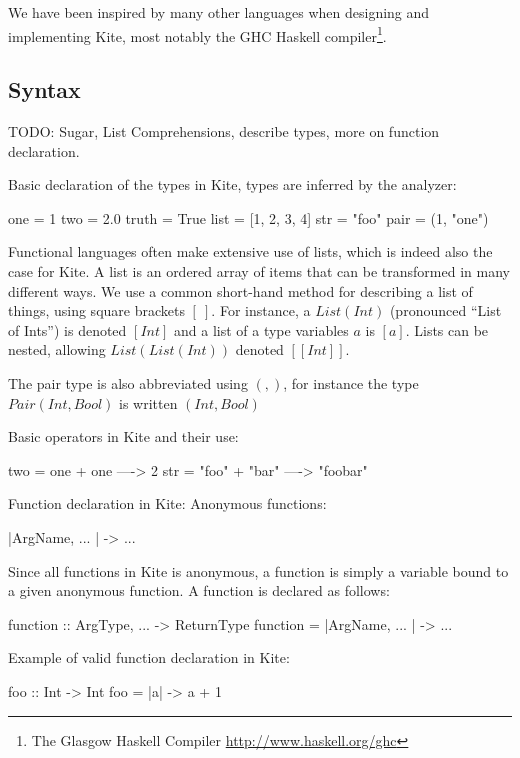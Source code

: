 We have been inspired by many other languages when designing and
implementing Kite, most notably the GHC Haskell compiler\footnote{The
  Glasgow Haskell Compiler \url{http://www.haskell.org/ghc}}.

\subsection{Syntax}

TODO: Sugar, List Comprehensions, describe types, more on function declaration.

Basic declaration of the types in Kite, types are inferred by the analyzer:
\begin{kite}
  
  one = 1
  two = 2.0
  truth = True
  list = [1, 2, 3, 4]
  str = "foo" 
  pair = (1, "one")
\end{kite}

Functional languages often make extensive use of lists, which is
indeed also the case for Kite. A list is an ordered array of items
that can be transformed in many different ways. We use a common
short-hand method for describing a list of things, using square
brackets $[\ ]$. For instance, a $List(Int)$ (pronounced ``List of
Ints'') is denoted $[Int]$ and a list of a type variables $a$ is
$[a]$. Lists can be nested, allowing $List(List(Int))$ denoted
$[[Int]]$.

The pair type is also abbreviated using $(,)$, for instance the type
$Pair(Int, Bool)$ is written $(Int, Bool)$

Basic operators in Kite and their use:
\begin{kite}

  two = one + one  ---->  2
  str = "foo" + "bar" ----> "foobar"
\end{kite}
Function declaration in Kite:
Anonymous functions:

\begin{kite}
  
|ArgName, ... | -> { ... }
\end{kite}
Since all functions in Kite is anonymous, a function is simply a
variable bound to a given anonymous function. A function is declared
as follows:

\begin{kite}
  
  function :: ArgType, ... -> ReturnType
  function = |ArgName, ... | -> { ... }
\end{kite}
Example of valid function declaration in Kite:
\begin{kite}
  
  foo :: Int -> Int
  foo = |a| -> {
    a + 1
  }
\end{kite}

